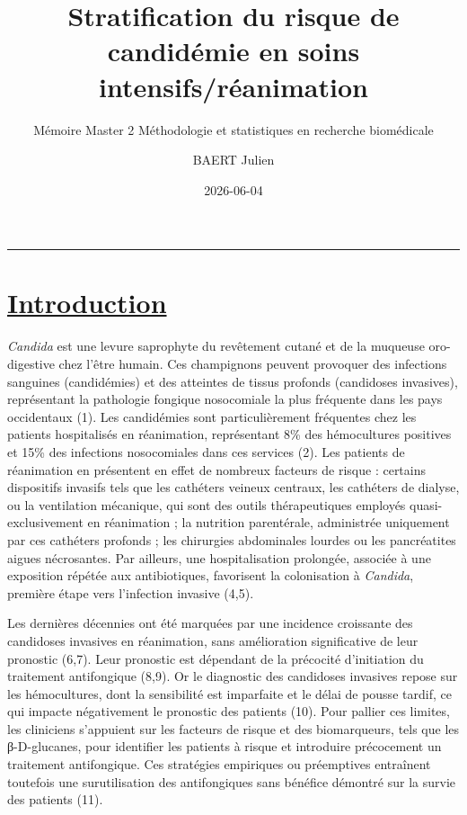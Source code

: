 \documentclass[
  french,
  letterpaper,
  DIV=11,
  numbers=noendperiod,
  justified]{scrartcl}
\title{Stratification du risque de candidémie en soins
intensifs/réanimation}
\subtitle{Mémoire Master 2 Méthodologie et statistiques en recherche
biomédicale}
\author{BAERT Julien}
\date{2026-06-04}
\renewcommand*\contentsname{Table des matières}
\newcommand\contentsname{Table des matières}
\begin{document}
\maketitle

\renewcommand*\contentsname{Table des matières}
{
\setcounter{tocdepth}{3}
\tableofcontents
}

\begin{center}\rule{0.5\linewidth}{0.5pt}\end{center}

\section{\texorpdfstring{\ul{Introduction}}{Introduction}}\label{introduction}

\emph{Candida} est une levure saprophyte du revêtement cutané et de la
muqueuse oro-digestive chez l'être humain. Ces champignons peuvent
provoquer des infections sanguines (candidémies) et des atteintes de
tissus profonds (candidoses invasives), représentant la pathologie
fongique nosocomiale la plus fréquente dans les pays occidentaux (1).
Les candidémies sont particulièrement fréquentes chez les patients
hospitalisés en réanimation, représentant 8\% des hémocultures positives
et 15\% des infections nosocomiales dans ces services (2). Les patients
de réanimation en présentent en effet de nombreux facteurs de risque :
certains dispositifs invasifs tels que les cathéters veineux centraux,
les cathéters de dialyse, ou la ventilation mécanique, qui sont des
outils thérapeutiques employés quasi-exclusivement en réanimation ; la
nutrition parentérale, administrée uniquement par ces cathéters profonds
; les chirurgies abdominales lourdes ou les pancréatites aigues
nécrosantes. Par ailleurs, une hospitalisation prolongée, associée à une
exposition répétée aux antibiotiques, favorisent la colonisation à
\emph{Candida}, première étape vers l'infection invasive (4,5).

Les dernières décennies ont été marquées par une incidence croissante
des candidoses invasives en réanimation, sans amélioration significative
de leur pronostic (6,7). Leur pronostic est dépendant de la précocité
d'initiation du traitement antifongique (8,9). Or le diagnostic des
candidoses invasives repose sur les hémocultures, dont la sensibilité
est imparfaite et le délai de pousse tardif, ce qui impacte négativement
le pronostic des patients (10). Pour pallier ces limites, les cliniciens
s'appuient sur les facteurs de risque et des biomarqueurs, tels que les
β-D-glucanes, pour identifier les patients à risque et introduire
précocement un traitement antifongique. Ces stratégies empiriques ou
préemptives entraînent toutefois une surutilisation des antifongiques
sans bénéfice démontré sur la survie des patients (11).
\end{document}
